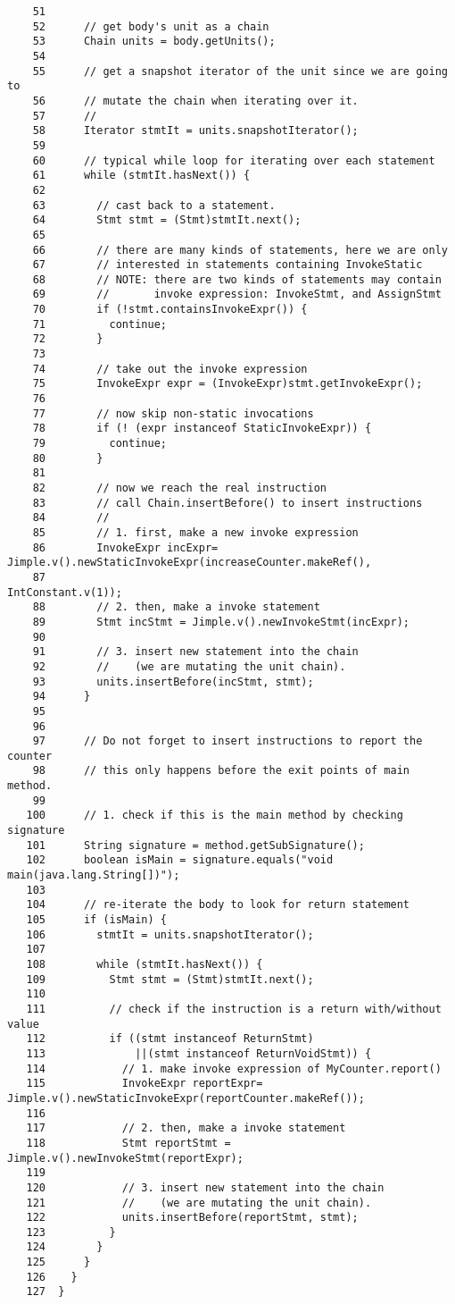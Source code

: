 \documentclass[12pt]{article}
\begin{document}
\begin{verbatim}
    51
    52      // get body's unit as a chain
    53      Chain units = body.getUnits();
    54
    55      // get a snapshot iterator of the unit since we are going to
    56      // mutate the chain when iterating over it.
    57      //
    58      Iterator stmtIt = units.snapshotIterator();
    59
    60      // typical while loop for iterating over each statement
    61      while (stmtIt.hasNext()) {
    62
    63        // cast back to a statement.
    64        Stmt stmt = (Stmt)stmtIt.next();
    65
    66        // there are many kinds of statements, here we are only
    67        // interested in statements containing InvokeStatic
    68        // NOTE: there are two kinds of statements may contain
    69        //       invoke expression: InvokeStmt, and AssignStmt
    70        if (!stmt.containsInvokeExpr()) {
    71          continue;
    72        }
    73
    74        // take out the invoke expression
    75        InvokeExpr expr = (InvokeExpr)stmt.getInvokeExpr();
    76
    77        // now skip non-static invocations
    78        if (! (expr instanceof StaticInvokeExpr)) {
    79          continue;
    80        }
    81
    82        // now we reach the real instruction
    83        // call Chain.insertBefore() to insert instructions
    84        //
    85        // 1. first, make a new invoke expression
    86        InvokeExpr incExpr= Jimple.v().newStaticInvokeExpr(increaseCounter.makeRef(),
    87                                                    IntConstant.v(1));
    88        // 2. then, make a invoke statement
    89        Stmt incStmt = Jimple.v().newInvokeStmt(incExpr);
    90
    91        // 3. insert new statement into the chain
    92        //    (we are mutating the unit chain).
    93        units.insertBefore(incStmt, stmt);
    94      }
    95
    96
    97      // Do not forget to insert instructions to report the counter
    98      // this only happens before the exit points of main method.
    99
   100      // 1. check if this is the main method by checking signature
   101      String signature = method.getSubSignature();
   102      boolean isMain = signature.equals("void main(java.lang.String[])");
   103
   104      // re-iterate the body to look for return statement
   105      if (isMain) {
   106        stmtIt = units.snapshotIterator();
   107
   108        while (stmtIt.hasNext()) {
   109          Stmt stmt = (Stmt)stmtIt.next();
   110
   111          // check if the instruction is a return with/without value
   112          if ((stmt instanceof ReturnStmt)
   113              ||(stmt instanceof ReturnVoidStmt)) {
   114            // 1. make invoke expression of MyCounter.report()
   115            InvokeExpr reportExpr= Jimple.v().newStaticInvokeExpr(reportCounter.makeRef());
   116
   117            // 2. then, make a invoke statement
   118            Stmt reportStmt = Jimple.v().newInvokeStmt(reportExpr);
   119
   120            // 3. insert new statement into the chain
   121            //    (we are mutating the unit chain).
   122            units.insertBefore(reportStmt, stmt);
   123          }
   124        }
   125      }
   126    }
   127  }
\end{verbatim}
\end{document}

